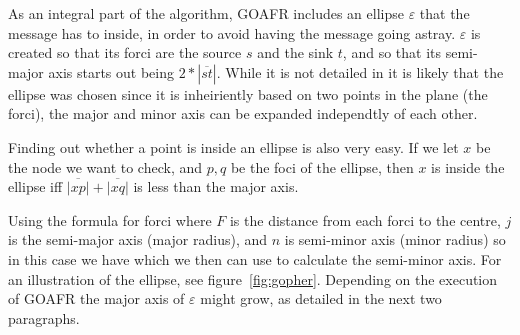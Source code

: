 As an integral part of the algorithm, GOAFR includes an ellipse $\varepsilon$ that the message has to inside, in order to avoid having the message going astray. $\varepsilon$ is created so that its forci are the source $s$ and the sink $t$, and so that its semi-major axis starts out being $2 * |\overline{st}|$. While it is not detailed in \cite{gopher} it is likely that the ellipse was chosen since it is inheiriently based on two points in the plane (the forci), the major and minor axis can be expanded independtly of each other. 

Finding out whether a point is inside an ellipse is also very easy. If we let $x$ be the node we want to check, and $p, q$ be the foci of the ellipse, then $x$ is inside the ellipse iff $\overline{|xp|} + \overline{|xq|}$ is less than the major axis.

Using the formula for forci
where $F$ is the distance from each forci to the centre, $j$ is the semi-major axis (major radius), and $n$ is semi-minor axis (minor radius) so in this case we have
which we then can use to calculate the semi-minor axis. For an illustration of the ellipse, see figure~\ref{fig:gopher}. Depending on the execution of GOAFR the major axis of $\varepsilon$ might grow, as detailed in the next two paragraphs. 

